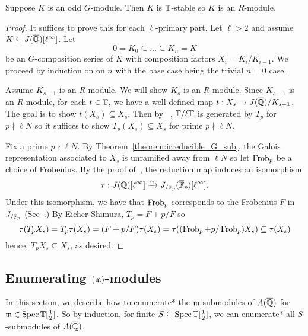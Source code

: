 \documentclass{article}
\begin{document}
\begin{theorem}\label{theorem:G_modules_are_Hecke}
    Suppose $K$ is an odd $G$-module. Then $K$ is $\mathbb{T}$-stable so $K$ is
    an $R$-module.
\end{theorem}
\begin{proof}
    It suffices to prove this for each $\ell$-primary part. Let $\ell>2$ and
    assume $K\subseteq J(\overline{\mathbb{Q}})[\ell^\infty]$. Let
    \[
        0 = K_0 \subseteq \ldots \subseteq K_n = K
    \]
    be an $G$-composition series of $K$ with composition factors $X_i =
    K_i/K_{i-1}$. We proceed by induction on on $n$ with the base
    case being the trivial $n=0$ case. 
    
    Assume $K_{s-1}$ is an $R$-module. We will show $K_s$ is an $R$-module.
    Since $K_{s-1}$ is an $R$-module, for each $t\in \mathbb{T}$, we have a
    well-defined map $t:X_s\to J(\overline{\mathbb{Q}})/K_{s-1}$. The goal is to show
    $t(X_s)\subseteq X_s$. Then by ~\cite[Proposition 2]{ribet:mult_p_finite}, $\mathbb{T}/\ell
    \mathbb{T}$ is generated by $T_p$ for $p\nmid \ell N$ so it suffices to show
    $T_p(X_s)\subseteq X_s$ for prime $p\nmid \ell N$.

    Fix a prime $p\nmid \ell N$. By Theorem~\ref{theorem:irreducible_G_sub},
    the Galois representation associated to $X_s$ is unramified away from $\ell
    N$ so let $\operatorname{Frob}_p$ be a choice of Frobenius. By the proof of~\cite[Lemma
    12.6.2]{ribet-stein:mod}, the reduction map induces an isomorphism
    \[
        \tau:J(\mathbb{Q})[\ell^\infty] \xrightarrow{\sim} J_{/\mathbb{F}_p} (\overline{\mathbb{F}}_p)[\ell^\infty].
    \]
    Under this isomorphism, we have that $\operatorname{Frob}_p$ corresponds to the Frobenius
    $F$ in $J_{/\mathbb{F}_p}$ (See~\cite[\S 5.3]{ribet-stein:serre}.) By
    Eicher-Shimura, $T_p = F+p/F$ so
    \[
    \tau(T_p X_s) 
    = T_p\tau(X_s) 
    = (F+p/F)\tau(X_s)
    = \tau((\operatorname{Frob}_p+p/\operatorname{Frob}_p)X_s)
    \subseteq \tau(X_s)
    \]
    hence, $T_p X_s\subseteq X_s$, as desired.
\end{proof}

\subsection{Enumerating $(\mathfrak{m})$-modules}%
\label{sub:enumerating_m_modules}

In this section, we describe how to enumerate* the $\mathfrak{m}$-submodules of
$A(\overline{\mathbb{Q}})$ for $\mathfrak{m}\in \operatorname{Spec} \mathbb{T}[\frac{1}{2}]$. So by induction, for finite
$S\subseteq \operatorname{Spec} \mathbb{T}[\frac{1}{2}]$, we can enumerate* all $S$-submodules of
$A(\overline{\mathbb{Q}})$.
\end{document}
